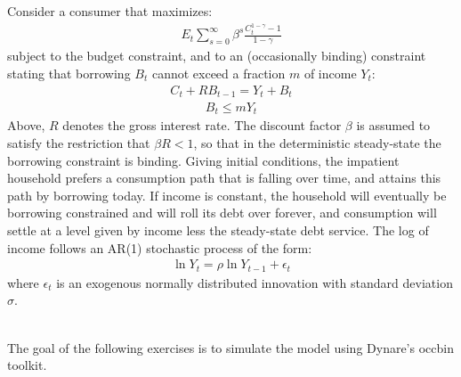 \documentclass{article}
\begin{document}
Consider a consumer that maximizes:
\begin{align*}
E_t \sum_{s=0}^\infty \beta^s \frac{C_t^{1-\gamma}-1}{1-\gamma}
\end{align*}
subject to the budget constraint, and to an (occasionally binding) constraint stating that borrowing $B_t$ cannot exceed a fraction $m$ of income $Y_t$:
\begin{align}
C_t + R B_{t-1} = Y_t + B_t \label{eq:borrcon:budget}
\end{align}
\begin{align}
B_t \leq m Y_t \label{eq:borrcon:constraint}
\end{align}
Above, $R$ denotes the gross interest rate.
The discount factor $\beta$ is assumed to satisfy the restriction that $\beta R <1$,
  so that in the deterministic steady-state the borrowing constraint is binding.
Giving initial conditions, the impatient household prefers a consumption path that is falling over time,
  and attains this path by borrowing today.
If income is constant, the household will eventually be borrowing constrained and will roll its debt over forever,
  and consumption will settle at a level given by income less the steady-state debt service.
The log of income follows an AR(1) stochastic process of the form:
\begin{align}
\ln Y_t = \rho \ln Y_{t-1} + \epsilon_t \label{eq:borrcon:LOM_Y}
\end{align}
where $\epsilon_t$ is an exogenous normally distributed innovation with standard deviation $\sigma$.

\noindent ~\\The goal of the following exercises is to simulate the model using Dynare's occbin toolkit.
\end{document}
